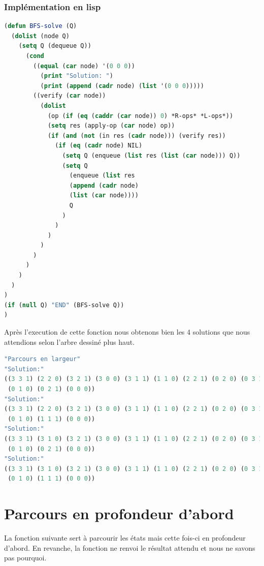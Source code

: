 \documentclass[a4paper, 12pt, leqno]{report}
\theoremstyle{plain}
\begin{document}
            \subsubsection{Implémentation en lisp}
            \begin{lstlisting}[label=some-code,caption=BFS-solve (N L) version largeur d'abord,language=lisp]
(defun BFS-solve (Q)
  (dolist (node Q)
    (setq Q (dequeue Q))
      (cond 
	    ((equal (car node) '(0 0 0)) 
	      (print "Solution: ") 
	      (print (append (cadr node) (list '(0 0 0)))))  
	    ((verify (car node)) 
	      (dolist 
	        (op (if (eq (caddr (car node)) 0) *R-ops* *L-ops*))
	        (setq res (apply-op (car node) op))
	        (if (and (not (in res (cadr node))) (verify res))
              (if (eq (cadr node) NIL)	
	            (setq Q (enqueue (list res (list (car node))) Q))
	            (setq Q 
	              (enqueue (list res 
	              (append (cadr node) 
	              (list (car node)))) 
	              Q
	            )
	          )
	        )
	      )	
	    )
	  )
	)
  )
)
(if (null Q) "END" (BFS-solve Q))	
)
            \end{lstlisting}
          Après l'execution de cette fonction nous obtenons bien les 4 solutions que nous attendions selon l'arbre dessiné plus haut.
            \begin{lstlisting}[label=some-code,caption=Résultat d'execution de la fonction de parcours en largeur d'abord.,language=lisp]
"Parcours en largeur" 
"Solution:" 
((3 3 1) (2 2 0) (3 2 1) (3 0 0) (3 1 1) (1 1 0) (2 2 1) (0 2 0) (0 3 1)
 (0 1 0) (0 2 1) (0 0 0)) 
"Solution:" 
((3 3 1) (2 2 0) (3 2 1) (3 0 0) (3 1 1) (1 1 0) (2 2 1) (0 2 0) (0 3 1)
 (0 1 0) (1 1 1) (0 0 0)) 
"Solution:" 
((3 3 1) (3 1 0) (3 2 1) (3 0 0) (3 1 1) (1 1 0) (2 2 1) (0 2 0) (0 3 1)
 (0 1 0) (0 2 1) (0 0 0)) 
"Solution:" 
((3 3 1) (3 1 0) (3 2 1) (3 0 0) (3 1 1) (1 1 0) (2 2 1) (0 2 0) (0 3 1)
 (0 1 0) (1 1 1) (0 0 0))  
            \end{lstlisting}             
        \section{Parcours en profondeur d'abord}
                    La fonction suivante sert à parcourir les états mais cette fois-ci en profondeur d'abord. En revanche, la fonction ne renvoi le résultat attendu et nous ne savons pas pourquoi.
\end{document}
